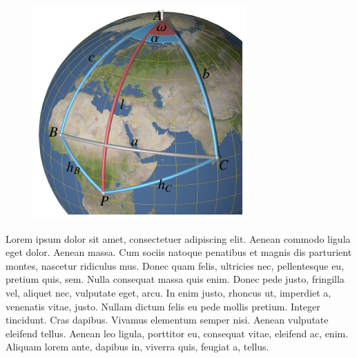 \documentclass[12pt]{article}
\begin{document}
\begin{figure}
\includegraphics{position1-small.pdf}
\end{figure}
Lorem ipsum dolor sit amet, consectetuer adipiscing elit.
Aenean
commodo ligula eget dolor.
Aenean massa.
Cum sociis natoque penatibus
et magnis dis parturient montes, nascetur ridiculus mus.
Donec quam
felis, ultricies nec, pellentesque eu, pretium quis, sem.
Nulla
consequat massa quis enim.
Donec pede justo, fringilla vel, aliquet
nec, vulputate eget, arcu.
In enim justo, rhoncus ut, imperdiet a,
venenatis vitae, justo.
Nullam dictum felis eu pede mollis pretium.
Integer tincidunt.
Cras dapibus.
Vivamus elementum semper nisi.
Aenean vulputate eleifend tellus.
Aenean leo ligula, porttitor eu,
consequat vitae, eleifend ac, enim.
Aliquam lorem ante, dapibus in,
viverra quis, feugiat a, tellus.
\end{document}
